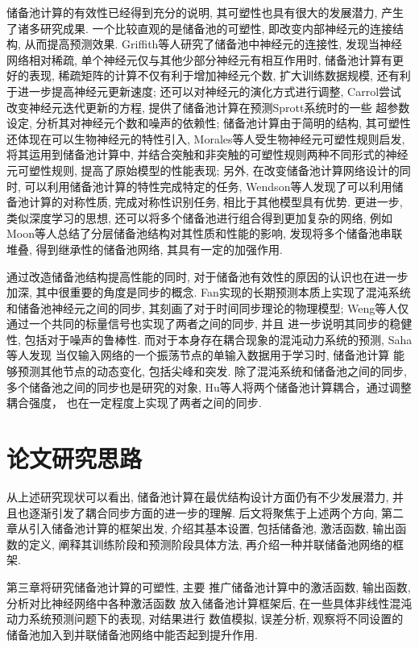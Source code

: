\documentclass[notitlepage,cs4size,punct,oneside]{ctexrep}
\numberwithin{equation}{chapter}
\theoremstyle{mystyle}
\begin{document}
储备池计算的有效性已经得到充分的说明, 其可塑性也具有很大的发展潜力, 产生了诸多研究成果. 
一个比较直观的是储备池的可塑性, 即改变内部神经元的连接结构, 从而提高预测效果. 
Griffith等人研究了储备池中神经元的连接性, 发现当神经网络相对稀疏, 
单个神经元仅与其他少部分神经元有相互作用时, 
储备池计算有更好的表现, 
稀疏矩阵的计算不仅有利于增加神经元个数, 扩大训练数据规模, 
还有利于进一步提高神经元更新速度\cite{AGAP}; 
还可以对神经元的演化方式进行调整, 
Carrol尝试改变神经元迭代更新的方程, 提供了储备池计算在预测Sprott系统时的一些
超参数设定, 分析其对神经元个数和噪声的依赖性\cite{TLC}; 
储备池计算由于简明的结构, 其可塑性还体现在可以生物神经元的特性引入, 
Morales等人受生物神经元可塑性规则启发, 将其运用到储备池计算中, 
并结合突触和非突触的可塑性规则两种不同形式的神经元可塑性规则, 
提高了原始模型的性能表现\cite{GBMC}; 
另外, 在改变储备池计算网络设计的同时, 可以利用储备池计算的特性完成特定的任务, 
Wendson等人发现了可以利用储备池计算的对称性质, 完成对称性识别任务, 
相比于其他模型具有优势\cite{WASB}. 
更进一步, 类似深度学习的思想, 还可以将多个储备池进行组合得到更加复杂的网络, 例如 
Moon等人总结了分层储备池结构对其性质和性能的影响, 发现将多个储备池串联堆叠, 
得到继承性的储备池网络, 其具有一定的加强作用\cite{JMYW}. 

通过改造储备池结构提高性能的同时, 对于储备池有效性的原因的认识也在进一步加深, 
其中很重要的角度是同步的概念. Fan实现的长期预测本质上实现了混沌系统和储备池神经元之间的同步, 
其刻画了对于时间同步理论的物理模型\cite{JFJJ}; 
Weng等人仅通过一个共同的标量信号也实现了两者之间的同步\cite{TWHY}, 并且
进一步说明其同步的稳健性, 包括对于噪声的鲁棒性\cite{XCTW}. 
而对于本身存在耦合现象的混沌动力系统的预测, Saha等人发现
当仅输入网络的一个振荡节点的单输入数据用于学习时, 储备池计算
能够预测其他节点的动态变化, 包括尖峰和突发\cite{SSAM}. 
除了混沌系统和储备池之间的同步, 多个储备池之间的同步也是研究的对象, 
Hu等人将两个储备池计算耦合，通过调整耦合强度，
也在一定程度上实现了两者之间的同步\cite{WHYZ}.


\section{论文研究思路}

从上述研究现状可以看出, 储备池计算在最优结构设计方面仍有不少发展潜力, 
并且也逐渐引发了耦合同步方面的进一步的理解. 
后文将聚焦于上述两个方向, 第二章从引入储备池计算的框架出发, 
介绍其基本设置, 包括储备池, 激活函数, 输出函数的定义, 
阐释其训练阶段和预测阶段具体方法, 再介绍一种并联储备池网络的框架. 

第三章将研究储备池计算的可塑性, 主要
推广储备池计算中的激活函数, 输出函数, 分析对比神经网络中各种激活函数
放入储备池计算框架后, 在一些具体非线性混沌动力系统预测问题下的表现, 对结果进行
数值模拟, 误差分析, 观察将不同设置的储备池加入到并联储备池网络中能否起到提升作用. 
\end{document}
